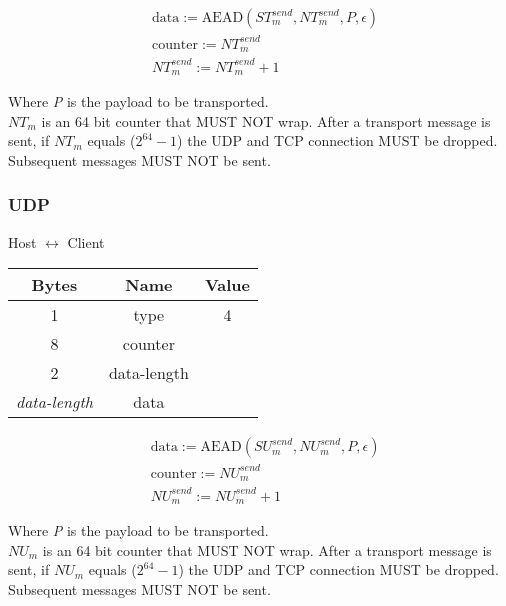 \begin{align*}
    & \text{data} := \text{AEAD}(\mathit{ST}_{m}^{send},\mathit{NT}_{m}^{send}, P, \epsilon)\\
    & \text{counter} := \mathit{NT}_{m}^{send}\\
    & \mathit{NT}_{m}^{send} := \mathit{NT}_{m}^{send} + 1
\end{align*}


Where \emph{P} is the payload to be transported.\\

$\mathit{NT}_{m}$ is an 64 bit counter that MUST NOT wrap. After a transport message is sent, if $\mathit{NT}_{m}$ equals
($2^{64}-1$) the UDP and TCP connection MUST be dropped. Subsequent messages MUST NOT be sent. \\



\subsubsection{UDP}

\begin{center}
    Host $\leftrightarrow$ Client\\
    \begin{tabular}{|c|c|c|}
        \hline
        \textbf{Bytes}     & \textbf{Name} & \textbf{Value} \\
        \hline
        1                  & type          & 4              \\
        \hline
        8                  & counter       &                \\
        \hline
        2                  & data-length   &                \\
        \hline
        \emph{data-length} & data          &                \\
        \hline
    \end{tabular}
\end{center}

\begin{align*}
    & \text{data} := \text{AEAD}(\mathit{SU}_{m}^{send},\mathit{NU}_{m}^{send}, P, \epsilon)\\
    & \text{counter} := \mathit{NU}_{m}^{send}\\
    & \mathit{NU}_{m}^{send} := \mathit{NU}_{m}^{send} + 1
\end{align*}


Where \emph{P} is the payload to be transported.\\

$\mathit{NU}_{m}$ is an 64 bit counter that MUST NOT wrap. After a transport message is sent, if $\mathit{NU}_{m}$ equals
($2^{64}-1$) the UDP and TCP connection MUST be dropped. Subsequent messages MUST NOT be sent. \\